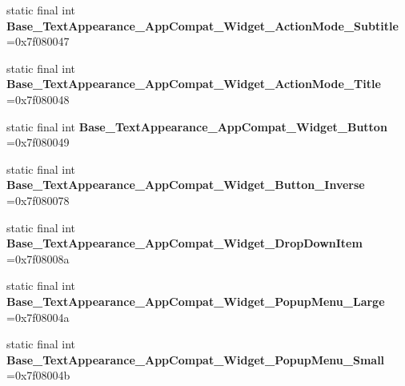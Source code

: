 \begin{DoxyCompactItemize}
\item 
\hypertarget{classcheck_1_1test_1_1_r_1_1style_a927f77b0ee9a6f8278885711612cf765}{}static final int {\bfseries Base\+\_\+\+Text\+Appearance\+\_\+\+App\+Compat\+\_\+\+Widget\+\_\+\+Action\+Mode\+\_\+\+Subtitle} =0x7f080047\label{classcheck_1_1test_1_1_r_1_1style_a927f77b0ee9a6f8278885711612cf765}

\item 
\hypertarget{classcheck_1_1test_1_1_r_1_1style_a3d32f953db900f3314b45a0a3d7a911c}{}static final int {\bfseries Base\+\_\+\+Text\+Appearance\+\_\+\+App\+Compat\+\_\+\+Widget\+\_\+\+Action\+Mode\+\_\+\+Title} =0x7f080048\label{classcheck_1_1test_1_1_r_1_1style_a3d32f953db900f3314b45a0a3d7a911c}

\item 
\hypertarget{classcheck_1_1test_1_1_r_1_1style_a6cd0ce58949dc035ded88337dad6b404}{}static final int {\bfseries Base\+\_\+\+Text\+Appearance\+\_\+\+App\+Compat\+\_\+\+Widget\+\_\+\+Button} =0x7f080049\label{classcheck_1_1test_1_1_r_1_1style_a6cd0ce58949dc035ded88337dad6b404}

\item 
\hypertarget{classcheck_1_1test_1_1_r_1_1style_ad91bced4b6141b9c190089176f84fcdb}{}static final int {\bfseries Base\+\_\+\+Text\+Appearance\+\_\+\+App\+Compat\+\_\+\+Widget\+\_\+\+Button\+\_\+\+Inverse} =0x7f080078\label{classcheck_1_1test_1_1_r_1_1style_ad91bced4b6141b9c190089176f84fcdb}

\item 
\hypertarget{classcheck_1_1test_1_1_r_1_1style_a78274bb3f4d8d2f193357d3f1adbc7f2}{}static final int {\bfseries Base\+\_\+\+Text\+Appearance\+\_\+\+App\+Compat\+\_\+\+Widget\+\_\+\+Drop\+Down\+Item} =0x7f08008a\label{classcheck_1_1test_1_1_r_1_1style_a78274bb3f4d8d2f193357d3f1adbc7f2}

\item 
\hypertarget{classcheck_1_1test_1_1_r_1_1style_a106ef19fbba68ae2477c81250fabce4a}{}static final int {\bfseries Base\+\_\+\+Text\+Appearance\+\_\+\+App\+Compat\+\_\+\+Widget\+\_\+\+Popup\+Menu\+\_\+\+Large} =0x7f08004a\label{classcheck_1_1test_1_1_r_1_1style_a106ef19fbba68ae2477c81250fabce4a}

\item 
\hypertarget{classcheck_1_1test_1_1_r_1_1style_a6b6aa6530c111f85abf68b30a8536d53}{}static final int {\bfseries Base\+\_\+\+Text\+Appearance\+\_\+\+App\+Compat\+\_\+\+Widget\+\_\+\+Popup\+Menu\+\_\+\+Small} =0x7f08004b\label{classcheck_1_1test_1_1_r_1_1style_a6b6aa6530c111f85abf68b30a8536d53}


\end{DoxyCompactItemize}
